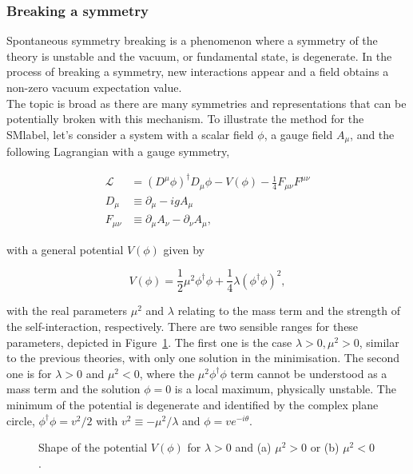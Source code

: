 \subsubsection{Breaking a symmetry}

Spontaneous symmetry breaking is a phenomenon where a symmetry of the theory is unstable and the vacuum, or fundamental state, is degenerate.
In the process of breaking a symmetry, new interactions appear and a field obtains a non-zero vacuum expectation value.\\

The topic is broad as there are many symmetries and representations that can be potentially broken with this mechanism. To illustrate the method for the \acrshort{SMlabel},
let's consider a system with a scalar field $\phi$, a gauge field $A_\mu$, and the following Lagrangian with a gauge symmetry,

\begin{equation}
    \begin{split}
    \mathcal{L}_{\ \ }&=(D^\mu\phi)^\dag D_\mu\phi - V(\phi) - \frac{1}{4}F_{\mu\nu}F^{\mu\nu}\\
    D_{\mu \ } &\equiv \partial_\mu - igA_\mu\\
    F_{\mu\nu}&\equiv\partial_\mu A_\nu - \partial_\nu A_\mu,
    \end{split}
\end{equation}

with a general potential $V(\phi)$ given by

\begin{equation}
    V(\phi) = \frac{1}{2}\mu^2\phi^\dag\phi + \frac{1}{4}\lambda(\phi^\dag\phi)^2,
\end{equation}

with the real parameters $\mu^2$ and $\lambda$ relating to the mass term and the strength of the self-interaction, respectively.
There are two sensible ranges for these parameters, depicted in Figure~\ref{figSM:higgspotential}. The first one is the case $\lambda>0,\mu^2>0$,
similar to the previous theories, with only one solution in the minimisation.
The second one is for $\lambda>0$ and $\mu^2<0$, where the $\mu^2\phi^\dag\phi$ term cannot be understood as a mass term and
the solution $\phi=0$ is a local maximum, physically unstable. The minimum of the potential is degenerate and identified by the complex
plane circle, $\phi^\dag\phi=v^2/2$ with $v^2\equiv-\mu^2/\lambda$ and $\phi = v e^{-i\theta}$.\\

\begin{figure}[htbp]
    \RawFloats
    \begin{center}
    \qquad
    \caption{Shape of the potential $V(\phi)$ for $\lambda>0$ and (a) $\mu^2>0$ or (b) $\mu^2<0$.
    }
    \label{figSM:higgspotential}
    \end{center}
\end{figure}

